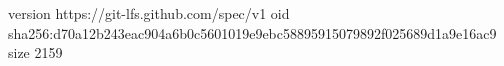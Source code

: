 version https://git-lfs.github.com/spec/v1
oid sha256:d70a12b243eac904a6b0c5601019e9ebc58895915079892f025689d1a9e16ac9
size 2159
